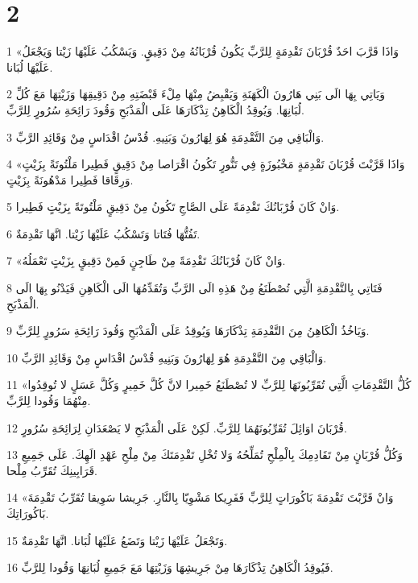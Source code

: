 \chapter{2}

\par 1 «وَاذَا قَرَّبَ احَدٌ قُرْبَانَ تَقْدِمَةٍ لِلرَّبِّ يَكُونُ قُرْبَانُهُ مِنْ دَقِيقٍ. وَيَسْكُبُ عَلَيْهَا زَيْتا وَيَجْعَلُ عَلَيْهَا لُبَانا.
\par 2 وَيَاتِي بِهَا الَى بَنِي هَارُونَ الْكَهَنَةِ وَيَقْبِضُ مِنْهَا مِلْءَ قَبْضَتِهِ مِنْ دَقِيقِهَا وَزَيْتِهَا مَعَ كُلِّ لُبَانِهَا. وَيُوقِدُ الْكَاهِنُ تِذْكَارَهَا عَلَى الْمَذْبَحِ وَقُودَ رَائِحَةِ سُرُورٍ لِلرَّبِّ.
\par 3 وَالْبَاقِي مِنَ التَّقْدِمَةِ هُوَ لِهَارُونَ وَبَنِيهِ. قُدْسُ اقْدَاسٍ مِنْ وَقَائِدِ الرَّبِّ.
\par 4 «وَاذَا قَرَّبْتَ قُرْبَانَ تَقْدِمَةٍ مَخْبُوزَةٍ فِي تَنُّورٍ تَكُونُ اقْرَاصا مِنْ دَقِيقٍ فَطِيرا مَلْتُوتَةً بِزَيْتٍ وَرِقَاقا فَطِيرا مَدْهُونَةً بِزَيْتٍ.
\par 5 وَانْ كَانَ قُرْبَانُكَ تَقْدِمَةً عَلَى الصَّاجِ تَكُونُ مِنْ دَقِيقٍ مَلْتُوتَةً بِزَيْتٍ فَطِيرا.
\par 6 تَفُتُّهَا فُتَاتا وَتَسْكُبُ عَلَيْهَا زَيْتا. انَّهَا تَقْدِمَةٌ.
\par 7 «وَانْ كَانَ قُرْبَانُكَ تَقْدِمَةً مِنْ طَاجِنٍ فَمِنْ دَقِيقٍ بِزَيْتٍ تَعْمَلُهُ.
\par 8 فَتَاتِي بِالتَّقْدِمَةِ الَّتِي تُصْطَنَعُ مِنْ هَذِهِ الَى الرَّبِّ وَتُقَدِّمُهَا الَى الْكَاهِنِ فَيَدْنُو بِهَا الَى الْمَذْبَحِ.
\par 9 وَيَاخُذُ الْكَاهِنُ مِنَ التَّقْدِمَةِ تِذْكَارَهَا وَيُوقِدُ عَلَى الْمَذْبَحِ وَقُودَ رَائِحَةِ سَرُورٍ لِلرَّبِّ.
\par 10 وَالْبَاقِي مِنَ التَّقْدِمَةِ هُوَ لِهَارُونَ وَبَنِيهِ قُدْسُ اقْدَاسٍ مِنْ وَقَائِدِ الرَّبِّ.
\par 11 «كُلُّ التَّقْدِمَاتِ الَّتِي تُقَرِّبُونَهَا لِلرَّبِّ لا تُصْطَنَعُ خَمِيرا لانَّ كُلَّ خَمِيرٍ وَكُلَّ عَسَلٍ لا تُوقِدُوا مِنْهُمَا وَقُودا لِلرَّبِّ.
\par 12 قُرْبَانَ اوَائِلَ تُقَرِّبُونَهُمَا لِلرَّبِّ. لَكِنْ عَلَى الْمَذْبَحِ لا يَصْعَدَانِ لِرَائِحَةِ سُرُورٍ.
\par 13 وَكُلُّ قُرْبَانٍ مِنْ تَقَادِمِكَ بِالْمِلْحِ تُمَلِّحُهُ وَلا تُخْلِ تَقْدِمَتَكَ مِنْ مِلْحِ عَهْدِ الَهِكَ. عَلَى جَمِيعِ قَرَابِينِكَ تُقَرِّبُ مِلْحا.
\par 14 «وَانْ قَرَّبْتَ تَقْدِمَةَ بَاكُورَاتٍ لِلرَّبِّ فَفَرِيكا مَشْوِيّا بِالنَّارِ. جَرِيشا سَوِيقا تُقَرِّبُ تَقْدِمَةَ بَاكُورَاتِكَ.
\par 15 وَتَجْعَلُ عَلَيْهَا زَيْتا وَتَضَعُ عَلَيْهَا لُبَانا. انَّهَا تَقْدِمَةٌ.
\par 16 فَيُوقِدُ الْكَاهِنُ تِذْكَارَهَا مِنْ جَرِيشِهَا وَزَيْتِهَا مَعَ جَمِيعِ لُبَانِهَا وَقُودا لِلرَّبِّ.

